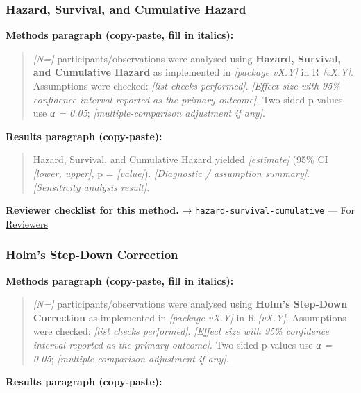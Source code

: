 \documentclass[
]{article}
\begin{document}
\subsubsection{Hazard, Survival, and Cumulative
Hazard}\label{hazard-survival-and-cumulative-hazard}

\textbf{Methods paragraph (copy-paste, fill in italics):}

\begin{quote}
\emph{{[}N={]}} participants/observations were analysed using
\textbf{Hazard, Survival, and Cumulative Hazard} as implemented in
\emph{{[}package vX.Y{]}} in R \emph{{[}vX.Y{]}}. Assumptions were
checked: \emph{{[}list checks performed{]}}. \emph{{[}Effect size with
95\% confidence interval reported as the primary outcome{]}}. Two-sided
p-values use \emph{α = 0.05}; \emph{{[}multiple-comparison adjustment if
any{]}}.
\end{quote}

\textbf{Results paragraph (copy-paste):}

\begin{quote}
Hazard, Survival, and Cumulative Hazard yielded \emph{{[}estimate{]}}
(95\% CI \emph{{[}lower, upper{]}}, p = \emph{{[}value{]}}).
\emph{{[}Diagnostic / assumption summary{]}}. \emph{{[}Sensitivity
analysis result{]}}.
\end{quote}

\textbf{Reviewer checklist for this method.} →
\href{../chapters/11-survival/hazard-survival-cumulative.Rmd\#for-reviewers}{\texttt{hazard-survival-cumulative}
--- For Reviewers}

\subsubsection{Holm's Step-Down
Correction}\label{holms-step-down-correction}

\textbf{Methods paragraph (copy-paste, fill in italics):}

\begin{quote}
\emph{{[}N={]}} participants/observations were analysed using
\textbf{Holm's Step-Down Correction} as implemented in \emph{{[}package
vX.Y{]}} in R \emph{{[}vX.Y{]}}. Assumptions were checked: \emph{{[}list
checks performed{]}}. \emph{{[}Effect size with 95\% confidence interval
reported as the primary outcome{]}}. Two-sided p-values use \emph{α =
0.05}; \emph{{[}multiple-comparison adjustment if any{]}}.
\end{quote}

\textbf{Results paragraph (copy-paste):}
\end{document}
